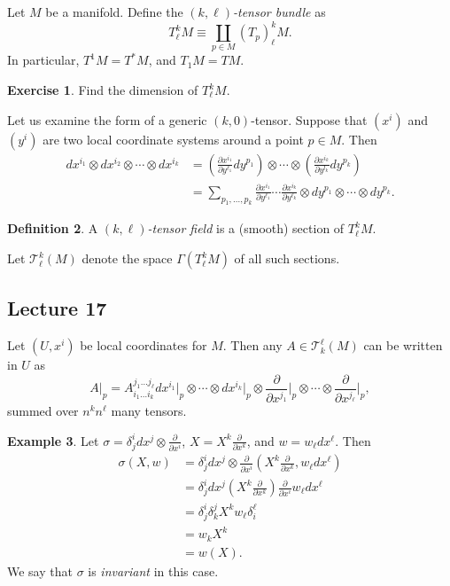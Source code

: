\documentclass[10pt,letterpaper,cm]{nupset}
\theoremstyle{definition}
\newtheorem{definition}{Definition}[subsection]
\newtheorem{exmp}[definition]{Example}
\theoremstyle{theorem}
\newtheorem{exercise}[definition]{Exercise}
\theoremstyle{remark}
\newcommand{\T}{\mathcal T}
\newcommand{\1}{\mathbf{1}}
\newcommand{\0}{\vec 0}
\begin{document}
Let $M$ be a manifold. Define the \textit{$(k, \ell)$-tensor bundle} as $$T _{\ell}^k M \equiv \coprod_{p\in M}\left(T_p\right)_{\ell}^k M.$$
In particular, $T^1 M = T^{\ast}M$, and $T_1 M = TM$.

\begin{exercise}
Find the dimension of $T_{\ell}^k M$.
\end{exercise}

\medskip

Let us examine the form of a generic $(k,0)$-tensor. Suppose that $\left(x^i\right)$ and $\left(y^i\right)$ are two local coordinate systems around a point $p\in M$. Then 
\begin{align*}
dx^{i_1} \otimes dx^{i_2} \otimes \cdots \otimes dx^{i_k} & = \left(\frac{\partial{x^{i_1}}}{\partial{y^{\ell_1}}} dy^{p_1}\right) \otimes \cdots \otimes \left(\frac{\partial{x^{i_k}}}{\partial{y^{l_k}}} dy^{p_k}\right)
\\ &  = \sum_{p_1, \ldots, p_k} \frac{\partial{x^{i_1}}}{\partial{y^{\ell_1}}}\cdots \frac{\partial{x^{i_k}}}{\partial{y^{\ell_k}}}  \otimes dy^{p_1} \otimes \cdots \otimes dy^{p_k}.
\end{align*}

\smallskip

\begin{definition}
A \textit{$(k, \ell)$-tensor field} is a (smooth) section of $T_{\ell}^kM$. 
\end{definition}

Let $\T_{\ell}^k(M)$ denote the space $\Gamma(T_{\ell}^kM)$ of all such sections.

\subsection{Lecture 17}


Let $(U, x^i)$ be local coordinates for $M$. Then any $A \in \T_k^{\ell}(M)$ can be written in $U$ as $$A\bigr\rvert_p = A_{i_1 \ldots i_k}^{j_1\ldots j_{\ell}} dx^{i_1}\bigr\rvert_p \otimes \cdots \otimes dx^{i_k}\bigr\rvert_p \otimes \frac{\partial}{\partial{x^{j_1}}}\bigr\rvert_p \otimes \cdots \otimes \frac{\partial}{\partial{x^{j_{\ell}}}}\bigr\rvert_p,$$ summed over $n^kn^{\ell}$ many tensors.


\begin{exmp}\label{exab}
Let $\sigma = \delta_j^i dx^j \otimes \frac{\partial}{\partial{x^i}}$, $X = X^k \frac{\partial}{\partial{x^k}}$, and $w = w_{\ell}dx^{\ell}$. Then 
\begin{align*}
\sigma(X, w) & = \delta_j^i dx^j \otimes \frac{\partial}{\partial{x^i}}(X^k \frac{\partial}{\partial{x^k}}, w_{\ell}dx^{\ell}) 
\\ & = \delta_j^i dx^j (X^k \frac{\partial}{\partial{x^k}}) \frac{\partial}{\partial{x^i}} w_{\ell}dx^{\ell} 
\\ & = \delta_j^i \delta_k^j X^k w_{\ell}\delta_i^{\ell} 
\\ & = w_kX^k
\\ & = w(X).
\end{align*}
 We say that $\sigma$ is \textit{invariant} in this case.
\end{exmp}
\end{document}
